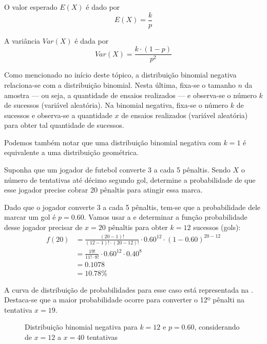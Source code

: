 O valor esperado $E(X)$ é dado por
\begin{equation}
    E(X) = \frac{k}{p}
\end{equation}

A variância $Var(X)$ é dada por
\begin{equation}
    Var(X) = \frac{k \cdot (1-p)}{p^2}
\end{equation}

Como mencionado no início deste tópico, a distribuição binomial negativa
relaciona-se com a distribuição binomial. Nesta última, fixa-se o tamanho $n$
da amostra --- ou seja, a quantidade de ensaios realizados --- e observa-se o
número $k$ de sucessos (variável aleatória). Na binomial negativa, fixa-se o
número $k$ de sucessos e observa-se a quantidade $x$ de ensaios realizados
(variável aleatória) para obter tal quantidade de sucessos.

Podemos também notar que uma distribuição binomial negativa com $k=1$ é
equivalente a uma distribuição geométrica.

\begin{eg}
Suponha que um jogador de futebol converte 3 a cada 5 pênaltis. Sendo $X$ o
número de tentativas até décimo segundo gol, determine a probabilidade de
que esse jogador precise cobrar 20 pênaltis para atingir essa marca.
\end{eg}

\begin{sol}
Dado que o jogador converte 3 a cada 5 pênaltis, tem-se que a probabilidade
dele marcar um gol é $p=0.60$. Vamos usar a  e
determinar a função probabilidade desse jogador precisar de $x=20$ pênaltis
para obter $k=12$ sucessos (gols):
\begin{align*}
f(20) &= \frac{(20-1)!}{(12-1)! \cdot (20-12)!} \cdot 0.60^{12} \cdot (1-0.60)^{20-12} \\
      &= \frac{19!}{11! \cdot 8!} \cdot 0.60^{12} \cdot 0.40^{8} \\
      &= 0.1078 \\
      &= 10.78 \%
\end{align*}

A curva de distribuição de probabilidades para esse caso está representada na
. Destaca-se que a maior probabilidade ocorre para
converter o 12º pênalti na tentativa $x=19$.
\end{sol}

\begin{figure}[htpb]
    \centering
    
    \caption{Distribuição binomial negativa para $k=12$ e $p=0.60$,
    considerando de $x=12$ a $x=40$ tentativas}
    \label{fig:exemplo_penalti}
\end{figure}

